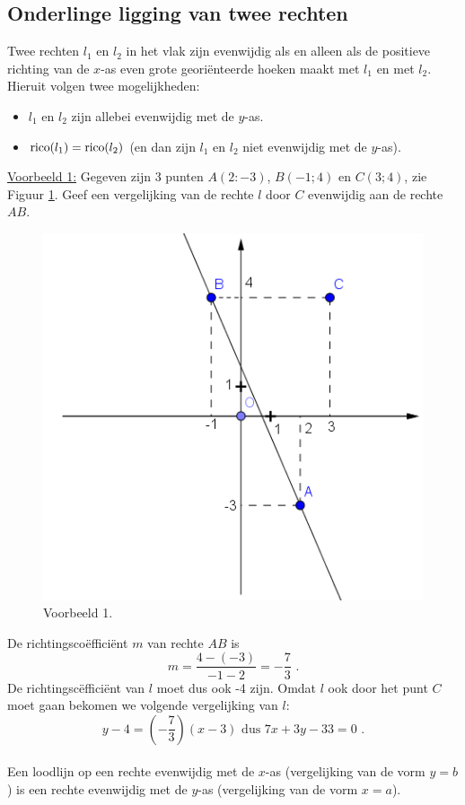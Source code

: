 \subsection{Onderlinge ligging van twee rechten}
\noindent

Twee rechten $l_1$ en $l_2$ in het vlak zijn evenwijdig als en alleen als de positieve richting van de $x$-as even grote geori\"enteerde hoeken maakt met $l_1$ en met $l_2$.
Hieruit volgen twee mogelijkheden:
\begin{itemize}
\item $l_1$ en $l_2$ zijn allebei evenwijdig met de $y$-as.
\item $\operatorname{rico} (l_1)=\operatorname{rico} (l_2)$ (en dan zijn $l_1$ en $l_2$ niet evenwijdig met de $y$-as).
\end{itemize}



\noindent \underline{Voorbeeld 1:} Gegeven zijn 3 punten $A(2:-3)$, $B(-1;4)$ en $C(3;4)$, zie Figuur \ref{fig4.2.10_fig1}.
Geef een vergelijking van de rechte $l$ door $C$ evenwijdig aan de rechte $AB$.
\begin{figure}[!htb]
\begin{center}
\includegraphics[height=7 cm]{4_opp_inhoud_an_meetk/inputs/AMTekst5Fig1}
\caption{Voorbeeld 1.}
\label{fig4.2.10_fig1}
\end{center}
\end{figure} 
De richtingsco\"effici\"ent $m$ van rechte $AB$ is
\[
m=\frac {4-(-3)}{-1-2}=-\frac {7}{3} \text { .}
\]
De richtingsc\"effici\"ent van $l$ moet dus ook -4 zijn.
Omdat $l$ ook door het punt $C$ moet gaan bekomen we volgende vergelijking van $l$:
\[
y-4=(-\frac {7}{3})(x-3) \text { dus } 7x+3y-33=0 \text { .}
\]\\

Een loodlijn op een rechte evenwijdig met de $x$-as (vergelijking van de vorm $y=b$) is een rechte evenwijdig met de $y$-as (vergelijking van de vorm $x=a$).

